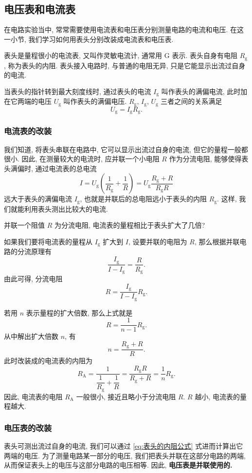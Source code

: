 \documentclass[UTF8,openany,fontset=fandol]{ctexbook}
\theoremstyle{chinesetextbook}
\begin{document}
\subsection{电压表和电流表}
在电路实验当中, 常常需要使用电流表和电压表分别测量电路的电流和电压. 在这一小节, 我们学习如何用表头分别改装成电流表和电压表.

表头是量程很小的电流表, 又叫作灵敏电流计, 通常用 G 表示. 表头自身有电阻 $R_\text{g}$, 称为表头的内阻. 表头接入电路时, 与普通的电阻无异, 只是它能显示出流过自身的电流.

当表头的指针转到最大刻度线时, 通过表头的电流 $I_\text{g}$ 叫作表头的满偏电流, 此时加在它两端的电压 $U_\text{g}$ 叫作表头的满偏电压. $R_\text{g}$, $I_\text{g}$, $U_\text{g}$ 三者之间的关系满足
\begin{equation}\label{eq:表头的内阻公式}
U_\text{g}=I_\text{g}R_\text{g}.
\end{equation}
\subsubsection{电流表的改装}
我们知道, 将表头串联在电路中, 它可以显示出流过自身的电流, 但它的量程一般都很小. 因此, 在测量较大的电流时, 应并联一个小电阻 $R$ 作为分流电阻, 能够使得表头满偏时, 通过电流表的总电流
\[
I=U_\text{g}\left(\frac{1}{R_\text{g}}+\frac{1}{R}\right)=U_\text{g}\frac{R_\text{g}+R}{R_\text{g}R}
\]
远大于表头的满偏电流 $I_\text{g}$, 也就是并联后的总电阻远小于表头的内阻 $R_\text{g}$. 这样, 我们就能利用表头测出比较大的电流.

{\kaishu 并联一个阻值 $R$ 为分流电阻, 电流表的量程相比于表头扩大了几倍?}

如果我们要将电流表的量程从 $I_\text{g}$ 扩大到 $I$, 设要并联的电阻为 $R$, 那么根据并联电路的分流原理有
\[
\frac{I_\text{g}}{I-I_\text{g}}=\frac{R}{R_\text{g}}.
\]
由此可得, 分流电阻
\[
R=\frac{I_\text{g}}{I-I_\text{g}}R_\text{g}.
\]

若用 $n$ 表示量程的扩大倍数, 那么上式就是
\[
R=\frac{1}{n-1}R_\text{g}.
\]
从中解出扩大倍数 $n$, 有
\[
n=\frac{R_\text{g}+R}{R}.
\]
此时改装成的电流表的内阻为
\[
R_\text{A}=\frac{1}{\dfrac{1}{R_\text{g}}+\dfrac{1}{R}}=\frac{R_\text{g}R}{R_\text{g}+R}=\frac{1}{n}R_\text{g}.
\]
因此, 电流表的电阻 $R_\text{A}$ 一般很小, 接近且略小于分流电阻 $R$. $R$ 越小, 电流表的量程越大.
\subsubsection{电压表的改装}
表头可测出流过自身的电流, 我们可以通过 \eqref{eq:表头的内阻公式} 式进而计算出它两端的电压. 为了测量电路某一部分的电压, 我们把表头并联在这部分电路的两端, 从而保证表头上的电压与这部分电路的电压相等. 因此, \textbf{电压表是并联使用的.}
\end{document}
